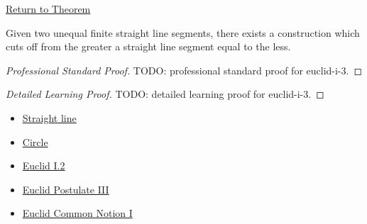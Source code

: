 \newpage
{}
\label{prf:euclid-i-3}

\begin{remark*}[Return]
\hyperref[thm:euclid-i-3]{Return to Theorem}
\end{remark*}

\begin{theorem*}
Given two unequal finite straight line segments, there exists a construction
which cuts off from the greater a straight line segment equal to the less.
\end{theorem*}

\begin{proof}[Professional Standard Proof]
\LRAProofBodyStart
TODO: professional standard proof for euclid-i-3.
\end{proof}

\begin{proof}[Detailed Learning Proof]
\LRAProofBodyStart
TODO: detailed learning proof for euclid-i-3.
\end{proof}

\begin{remark*}
\end{remark*}

\begin{dependencies}
\begin{itemize}
  \item \hyperref[def:euclid-straight-line]{Straight line}
  \item \hyperref[def:euclid-circle]{Circle}
  \item \hyperref[thm:euclid-i-2]{Euclid I.2}
  \item \hyperref[ax:euclid-postulate-describe-circle]{Euclid Postulate III}
  \item \hyperref[ax:euclid-common-notion-things-equal-to-same]{Euclid Common Notion I}
\end{itemize}
\end{dependencies}

\clearpage
